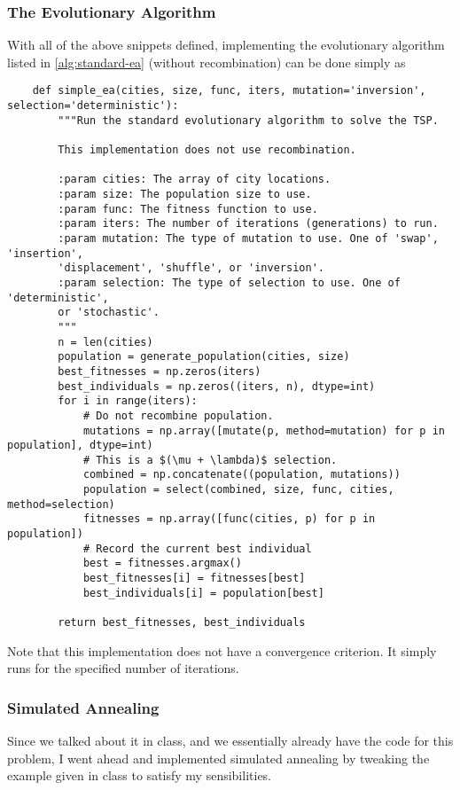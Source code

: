 \documentclass{article}
\begin{document}

\subsubsection{The Evolutionary Algorithm}
With all of the above snippets defined, implementing the evolutionary algorithm listed in
\autoref{alg:standard-ea} (without recombination) can be done simply as

\begin{verbatim}
    def simple_ea(cities, size, func, iters, mutation='inversion', selection='deterministic'):
        """Run the standard evolutionary algorithm to solve the TSP.

        This implementation does not use recombination.

        :param cities: The array of city locations.
        :param size: The population size to use.
        :param func: The fitness function to use.
        :param iters: The number of iterations (generations) to run.
        :param mutation: The type of mutation to use. One of 'swap', 'insertion',
        'displacement', 'shuffle', or 'inversion'.
        :param selection: The type of selection to use. One of 'deterministic',
        or 'stochastic'.
        """
        n = len(cities)
        population = generate_population(cities, size)
        best_fitnesses = np.zeros(iters)
        best_individuals = np.zeros((iters, n), dtype=int)
        for i in range(iters):
            # Do not recombine population.
            mutations = np.array([mutate(p, method=mutation) for p in population], dtype=int)
            # This is a $(\mu + \lambda)$ selection.
            combined = np.concatenate((population, mutations))
            population = select(combined, size, func, cities, method=selection)
            fitnesses = np.array([func(cities, p) for p in population])
            # Record the current best individual
            best = fitnesses.argmax()
            best_fitnesses[i] = fitnesses[best]
            best_individuals[i] = population[best]

        return best_fitnesses, best_individuals
\end{verbatim}

Note that this implementation does not have a convergence criterion. It simply runs for the
specified number of iterations.

\subsubsection{Simulated Annealing}
Since we talked about it in class, and we essentially already have the code for this problem, I
went ahead and implemented simulated annealing by tweaking the example given in class to satisfy my
sensibilities.
\end{document}
